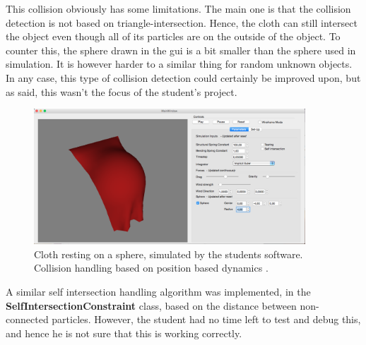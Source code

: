 This collision obviously has some limitations. The main one is that the collision detection is not based on triangle-intersection. Hence, the cloth can still intersect the object even though all of its particles are on the outside of the object. To counter this, the sphere drawn in the gui is a bit smaller than the sphere used in simulation. It is however harder to a similar thing for random unknown objects. In any case, this type of collision detection could certainly be improved upon, but as said, this wasn't the focus of the student's project.\\

\begin{figure}[!htb]
  \centering
  \includegraphics[width=4in,natwidth=366,natheight=166]{img/collision.png}
  \caption
   {Cloth resting on a sphere, simulated by the students software. Collision handling based on position based dynamics \citep{position_based_dyn}.}
 \label{collision}
\end{figure}

A similar self intersection handling algorithm was implemented, in the {\bf SelfIntersectionConstraint} class, based on the distance between non-connected particles. However, the student had no time left to test and debug this, and hence he is not sure that this is working correctly.


\ifx\isEmbedded\undefined


\pagebreak

\fi